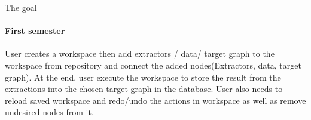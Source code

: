 \begin{frame}{The goal}
\framesubtitle{First semester}
	User creates a workspace then add extractors / data/ target graph  to the workspace from repository and connect the added nodes(Extractors, data, target graph). At the end, user execute the workspace to store the result from the extractions into the chosen target graph in the database. User also needs to reload saved workspace and redo/undo the actions in workspace as well as remove undesired nodes from it.

\end{frame}